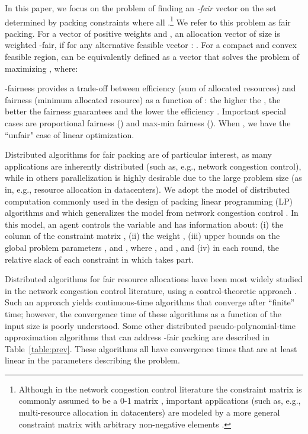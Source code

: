 \documentclass[11pt]{article}
\begin{document}
In this paper, we focus on the problem of finding an {\em -fair} vector on the set determined by packing constraints  where all .\footnote{Although in the network congestion control literature the constraint matrix  is commonly assumed to be a 0-1 matrix \cite{kelly1998rate, kelly2014stochastic, yi2008stochastic, paganini2005congestion, MoWalrand2000, low2002internet}, important applications (such as, e.g., multi-resource allocation in datacenters) are modeled by a more general constraint matrix  with arbitrary non-negative elements \cite{bonald2015multi, ghodsi2011dominant, joe2013multiresource, Im2014competitive}.} We refer to this problem as fair packing. 
For a vector of positive weights  and , an allocation vector  of size  is weighted -fair, if for any alternative feasible vector :  \cite{MoWalrand2000}. For a compact and convex feasible region,  can be equivalently defined as a vector that solves the problem of maximizing  \cite{MoWalrand2000}, where: 

-fairness provides a trade-off between efficiency (sum of allocated resources) and fairness (minimum allocated resource) as a function of : the higher the , the better the fairness guarantees and the lower the efficiency \cite{atkinson1970measurement,bertsimas2012efficiency,lan2010axiomatic}.  Important special cases are 
proportional fairness () and max-min fairness ().  When , we have the ``unfair" case of  linear optimization.


Distributed algorithms for fair packing are of particular interest, as many applications are inherently distributed (such as, e.g., network congestion control), while in others parallelization is highly desirable due to the large problem size (as in, e.g., resource allocation in datacenters). We adopt the model of distributed computation commonly used in the design of 
packing linear programming (LP) algorithms \cite{AwerbuchKhandekar2009, d-allen2014using, d-bartal1997global, d-kuhn2006price, d-luby1993parallel, d-papadimitriou1993linear} and which generalizes the model from network congestion control \cite{kelly2014stochastic}.  In this model, an agent  controls the variable  and has information about: (i) the  column of the  constraint matrix , (ii) the weight , (iii) upper bounds on the global problem parameters , and , where , and , and (iv) in each round, the relative slack of each constraint  in which  takes part. 

Distributed algorithms for fair resource allocations have been most widely studied in the network congestion control literature, using a control-theoretic approach \cite{kelly1998rate, kelly2014stochastic, yi2008stochastic, paganini2005congestion, MoWalrand2000, low2002internet}. Such an approach yields continuous-time algorithms that converge after ``finite'' time; however, the convergence time of these algorithms as a function of the input size is poorly understood. Some  other distributed pseudo-polynomial-time approximation algorithms that can address -fair packing are described in Table~\ref{table:prev}. These algorithms all have convergence times that are at least linear in the parameters describing the problem.  
\end{document}
